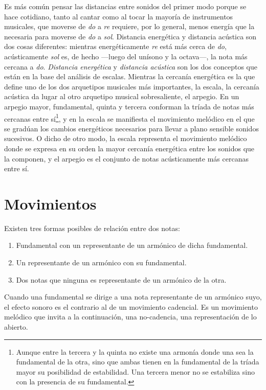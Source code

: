 \documentclass[a4paper,10pt]{article}
\begin{document}
\begin{multicols}{2}
  Es más común pensar las distancias entre sonidos del primer modo porque se hace cotidiano, tanto al cantar como al tocar la mayoría de instrumentos musicales, que moverse de \emph{do} a \emph{re} requiere, por lo general, menos energía que la necesaria para moverse de \emph{do} a \emph{sol}. Distancia energética y distancia acústica son dos cosas diferentes: mientras energéticamente \emph{re} está más cerca de \emph{do}, acústicamente \emph{sol} es, de hecho ---luego del unísono y la octava---, la nota más cercana a \emph{do}. \emph{Distancia energética} y \emph{distancia acústica} son los dos conceptos que están en la base del análisis de escalas. Mientras la cercanía energética es la que define uno de los dos arquetipos musicales más importantes, la escala, la cercanía acústica da lugar al otro arquetipo musical sobresaliente, el arpegio. En un arpegio mayor, fundamental, quinta y tercera conforman la tríada de notas más cercanas entre sí\footnote{Aunque entre la tercera y la quinta no existe una armonía donde una sea la fundamental de la otra, sino que ambas tienen en la fundamental de la tríada mayor su posibilidad de estabilidad. Una tercera menor no se estabiliza sino con la presencia de su fundamental.}, y en la escala se manifiesta el movimiento melódico en el que se gradúan los cambios energéticos necesarios para llevar a plano sensible sonidos sucesivos. O dicho de otro modo, la escala representa el movimiento melódico donde se expresa en su orden la mayor cercanía energética entre los sonidos que la componen, y el arpegio es el conjunto de notas acústicamente más cercanas entre sí.

\section{Movimientos}\label{sec:movimientos}

  Existen tres formas posibles de relación entre dos notas:
  \begin{enumerate}
    \item Fundamental con un representante de un armónico de dicha fundamental.
    \item Un representante de un armónico con su fundamental.
    \item Dos notas que ninguna es representante de un armónico de la otra.
  \end{enumerate}

  Cuando una fundamental se dirige a una nota representante de un armónico suyo, el efecto sonoro es el contrario al de un movimiento cadencial. Es un movimiento melódico que invita a la continuación, una no-cadencia, una representación de lo abierto.


\end{multicols}
\end{document}
